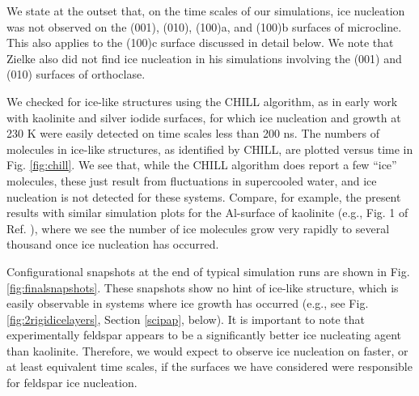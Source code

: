 \documentclass[preprint,aps,prb,floatfix]{revtex4-1}
\begin{document}
We state at the outset that, on the time scales of our simulations, ice nucleation was not observed on the (001), (010), (100)a, and (100)b surfaces of microcline. This also applies to the (100)c surface discussed in detail below.
We note that Zielke\cite{Z16} also did not find ice nucleation in his simulations involving the (001) and (010) surfaces of orthoclase. 

We checked for ice-like structures using the CHILL algorithm,\cite{MLWSM10} as in early work with kaolinite\cite{ZBP15b} and silver iodide\cite{ZBP15a} surfaces, for which ice nucleation and growth at 230 K were easily detected on time scales less than 200 ns. The numbers of molecules in ice-like structures, as identified by CHILL, are plotted versus time in Fig. \ref{fig:chill}. We see that, while the CHILL algorithm does report a few ``ice'' molecules, these just result from fluctuations in supercooled water, and ice nucleation is not detected for these systems. Compare, for example, the present results with similar simulation plots for the Al-surface of kaolinite (e.g., Fig. 1 of Ref. ), where we see the number of ice molecules grow very rapidly to several thousand once ice nucleation has occurred.

Configurational snapshots at the end of typical simulation runs are shown in Fig. \ref{fig:finalsnapshots}. These snapshots show no hint of ice-like structure, which is easily observable in systems where ice growth has occurred (e.g., see Fig. \ref{fig:2rigidicelayers}, Section \ref{scipap}, below). It is important to note that experimentally feldspar appears to be a significantly  better ice nucleating agent than kaolinite.\cite{AMWW13,AWKE14,ZWSH08} Therefore, we would expect to observe ice nucleation on faster, or at least equivalent time scales, if the surfaces we have considered were responsible for feldspar ice nucleation. 
\end{document}
